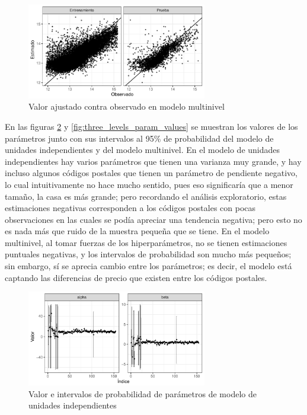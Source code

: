 \begin{figure}[H]
    \centering
    \includegraphics[width=0.7\textwidth]{images/three_levels_obs_vs_pred.pdf}
    \caption{Valor ajustado contra observado en modelo multinivel}
    \label{fig:three_levels_obs_vs_pred}
\end{figure}

En las figuras \ref{fig:no_pooling_param_values} y \ref{fig:three_levels_param_values} se muestran los valores de los parámetros junto con sus intervalos al 95\% de probabilidad del modelo de unidades independientes y del modelo multinivel. En el modelo de unidades independientes hay varios parámetros que tienen una varianza muy grande, y hay incluso algunos códigos postales que tienen un parámetro de pendiente negativo, lo cual intuitivamente no hace mucho sentido, pues eso significaría que a menor tamaño, la casa es más grande; pero recordando el análisis exploratorio, estas estimaciones negativas corresponden a los códigos postales con pocas observaciones en las cuales se podía apreciar una tendencia negativa; pero esto no es nada más que ruido de la muestra pequeña que se tiene. En el modelo multinivel, al tomar fuerzas de los hiperparámetros, no se tienen estimaciones puntuales negativas, y los intervalos de probabilidad son mucho más pequeños; sin embargo, sí se aprecia cambio entre los parámetros; es decir, el modelo está captando las diferencias de precio que existen entre los códigos postales.

\begin{figure}[H]
    \centering
    \includegraphics[width=0.7\textwidth]{images/no_pooling_param_values.pdf}
    \caption{Valor e intervalos de probabilidad de parámetros de modelo de unidades independientes}
    \label{fig:no_pooling_param_values}
\end{figure}

